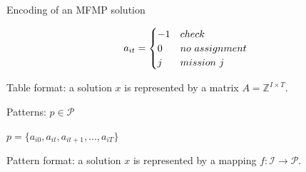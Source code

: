 \begin{frame}

\begin{block}{Encoding of an MFMP solution}

\begin{align}
 a_{it} = 
  \begin{cases} 
   -1 & check \\
   0 & no\,\,assignment \\
   j & mission\,\, j \\
  \end{cases}\notag
\end{align}

Table format: a solution \(x\) is represented by a matrix
\(A = \mathbb{Z}^{I \times T}\).

Patterns: \(p \in \mathcal{P}\)

\(p = \{a_{i0}, a_{it}, a_{it+1}, ..., a_{iT}\}\)

Pattern format: a solution \(x\) is represented by a mapping
\(f: \mathcal{I} \to \mathcal{P}\).

\end{block}

\end{frame}

